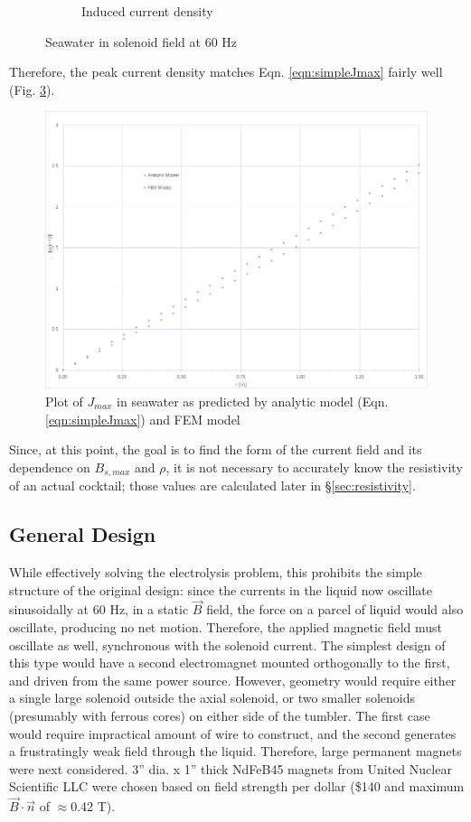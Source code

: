\documentclass[]{article}
\begin{document}
\begin{figure}[h]
\begin{subfigure}{0.45\textwidth}
		\caption{Induced current density}
		\label{fig:seawaterj}
	\end{subfigure}
	\caption{Seawater in solenoid field at 60 Hz}
\end{figure}
Therefore, the peak current density matches Eqn. \ref{eqn:simpleJmax} fairly well (Fig. \ref{fig:seawaterJcomparison}).
\begin{figure}
	\centering
	\includegraphics[width=1\textwidth]{SeawaterJComparison}
	\caption{Plot of $J_{max}$ in seawater as predicted by analytic model (Eqn. \ref{eqn:simpleJmax}) and FEM model}
	\label{fig:seawaterJcomparison}
\end{figure}

\par Since, at this point, the goal is to find the form of the current field and its dependence on $B_{s,max}$ and $\rho$, it is not necessary to accurately know the resistivity of an actual cocktail; those values are calculated later in \S\ref{sec:resistivity}.

\subsection{General Design}
\par While effectively solving the electrolysis problem, this prohibits the simple structure of the original design: since the currents in the liquid now oscillate sinusoidally at 60 Hz, in a static $\vec{B}$ field, the force on a parcel of liquid would also oscillate, producing no net motion. Therefore, the applied magnetic field must oscillate as well, synchronous with the solenoid current. The simplest design of this type would have a second electromagnet mounted orthogonally to the first, and driven from the same power source. However, geometry would require either a single large solenoid outside the axial solenoid, or two smaller solenoids (presumably with ferrous cores) on either side of the tumbler. The first case would require impractical amount of wire to construct, and the second generates a frustratingly weak field through the liquid. Therefore, large permanent magnets were next considered. 3'' dia. x 1'' thick NdFeB45 magnets from United Nuclear Scientific LLC were chosen based on field strength per dollar (\$140 and maximum $\vec{B}\cdot\vec{n}$ of $\approx$0.42 T).
\end{document}
